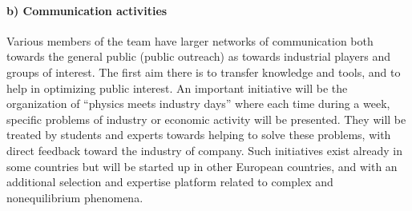 \paragraph{b) Communication activities}


Various members of the team have larger networks of communication both towards the general
public (public outreach) as towards industrial players and groups of interest.  The first
aim there is to transfer knowledge and tools, and to help in optimizing public interest. An
important initiative will be the organization of ``physics meets industry days'' where each
time during a week, specific problems of industry or economic activity will be presented.
They will be treated by students and experts towards helping to solve these problems, with
direct feedback toward the industry of company.  Such initiatives exist already in some
countries but will be started up in other European countries, and with an additional
selection and expertise platform related to complex and nonequilibrium phenomena.



